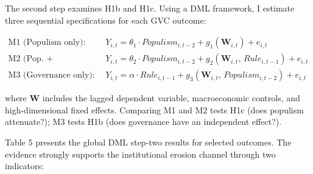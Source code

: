 \documentclass[12pt]{article}
\begin{document}
The second step examines H1b and H1c. Using a DML framework, I estimate three sequential specifications for each GVC outcome:

\begin{align}
\text{M1 (Populism only):} \quad
  & Y_{i,t} = \theta_1 \cdot Populism_{i,t-2} + g_1(\mathbf{W}_{i,t}) + e_{i,t} \label{eq:dml1}\\
\text{M2 (Pop.\ + Governance):} \quad
  & Y_{i,t} = \theta_2 \cdot Populism_{i,t-2} + g_2(\mathbf{W}_{i,t},\, Rule_{i,t-1}) + e_{i,t} \label{eq:dml2}\\
\text{M3 (Governance only):} \quad
  & Y_{i,t} = \alpha \cdot Rule_{i,t-1} + g_3(\mathbf{W}_{i,t},\, Populism_{i,t-2}) + e_{i,t} \label{eq:dml3}
\end{align}

where $\mathbf{W}$ includes the lagged dependent variable, macroeconomic controls, and high-dimensional fixed effects. Comparing M1 and M2 tests H1c (does populism attenuate?); M3 tests H1b (does governance have an independent effect?).

Table 5 presents the global DML step-two results for selected outcomes. The evidence strongly supports the institutional erosion channel through two indicators:
\end{document}

